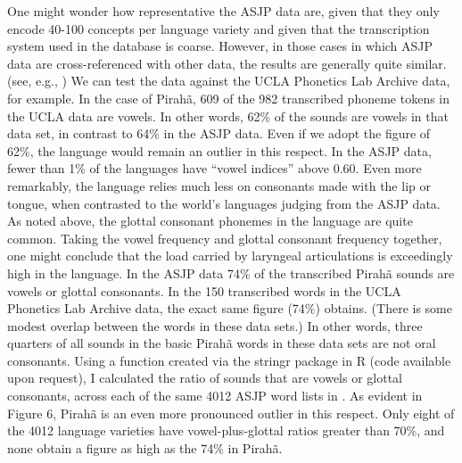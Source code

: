 \documentclass[output=paper,colorlinks,citecolor=brown
]{langscibook}
\begin{document}
    One might wonder how representative the ASJP data are, given that they only encode 40-100 concepts per language variety and given that the transcription system used in the database is coarse. However, in those cases in which ASJP data are cross-referenced with other data, the results are generally quite similar. (see, e.g., \cite{everett2021speech}) We can test the data against the UCLA Phonetics Lab Archive data, for example. In the case of Pirahã, 609 of the 982 transcribed phoneme tokens in the UCLA data are vowels. In other words, 62\% of the sounds are vowels in that data set, in contrast to 64\% in the ASJP data. Even if we adopt the figure of 62\%, the language would remain an outlier in this respect. In the ASJP data, fewer than 1\% of the languages have “vowel indices” above 0.60.
    Even more remarkably, the language relies much less on consonants made with the lip or tongue, when contrasted to the world’s languages judging from the ASJP data. As noted above, the glottal consonant phonemes in the language are quite common. Taking the vowel frequency and glottal consonant frequency together, one might conclude that the load carried by laryngeal articulations is exceedingly high in the language. In the ASJP data 74\% of the transcribed Pirahã sounds are vowels or glottal consonants. In the 150 transcribed words in the UCLA Phonetics Lab Archive data, the exact same figure (74\%) obtains. (There is some modest overlap between the words in these data sets.) In other words, three quarters of all sounds in the basic Pirahã words in these data sets are not oral consonants. Using a function created via the stringr package in R (code available upon request), I calculated the ratio of sounds that are vowels or glottal consonants, across each of the same 4012 ASJP word lists in \cite{everett2017languages}. As evident in Figure 6, Pirahã is an even more pronounced outlier in this respect. Only eight of the 4012 language varieties have vowel-plus-glottal ratios greater than 70\%, and none obtain a figure as high as the 74\% in Pirahã.
\end{document}
